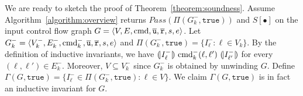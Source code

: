 We are ready to sketch the proof of Theorem~\ref{theorem:soundness}. 
Assume Algorithm~\ref{algorithm:overview} returns $\mathit{Pass} (\Pi
(G^-_k, \mathtt{true}))$ and $S[\bullet]$ on the input control flow graph $G =
\langle V, E, \textmd{cmd}, \overline{\mathtt{u}}, \overline{\mathtt{r}},s,e \rangle$. Let $G^-_k = \langle V^-_k, E^-_k,
\textmd{cmd}^-_k , \overline{\mathtt{u}}, \overline{\mathtt{r}},s,e \rangle$ and $\Pi (G^-_k, \mathtt{true}) = \{ I^-_{\ell}
: \ell \in V_k \}$. By the definition of inductive invariants, we have
$(\!| {I^-_{\ell}} |\!)\ \textmd{cmd}^-_k (\ell, \ell')\ (\!| {I^-_{\ell'}} |\!)$
for every $(\ell, \ell') \in E^-_k$. Moreover, $V \subseteq V^-_k$ since
$G^-_k$ is obtained by unwinding $G$. Define 
$\Gamma (G, \mathtt{true}) = \{ I^-_{\ell} \in \Pi (G^-_k,
\mathtt{true}) : \ell \in V \}$. We claim $\Gamma (G, \mathtt{true})$
is in fact an inductive invariant for $G$. 

